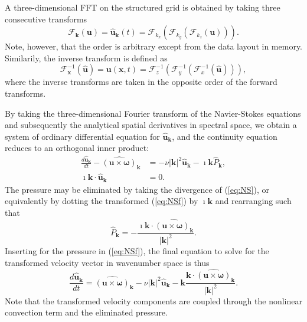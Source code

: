 \documentclass[11pt, oneside]{article}
\begin{document}
A three-dimensional FFT on the structured grid is obtained by taking three consecutive transforms
\begin{equation}
\mathcal{F}_{\bm{k}}(\bm{u}) = \hat{\bm{u}}_{\bm{k}}(t) = \mathcal{F}_{k_x}\left(\mathcal{F}_{k_y}\left(\mathcal{F}_{k_z}(\bm{u})\right)\right).
\label{eq:FourierT3D}
\end{equation}
Note, however, that the order is arbitrary except from the data layout in memory. Similarily, the inverse transform is defined as
\begin{equation}
\mathcal{F}^{-1}_{\bm{x}}(\hat{\bm{u}}) = \bm{u}(\bm{x}, t) = \mathcal{F}^{-1}_{z}\left(\mathcal{F}^{-1}_{y}\left(\mathcal{F}^{-1}_{x}(\hat{\bm{u}})\right)\right),
\end{equation}
where the inverse transforms are taken in the opposite order of the forward transforms.

By taking the three-dimensional Fourier transform of the Navier-Stokes equations and subsequently the analytical spatial derivatives in spectral space, we obtain a system of ordinary differential equation for $\hat{\bm{u}}_{\bm{k}}$, and the continuity equation reduces to an orthogonal inner product:
\begin{align}
 \frac{d\hat{\bm{u}}_{\bm{k}}}{d t} - \widehat{( \bm{u} \times \bm{\omega})}_{\bm{k}} &= - \nu |\bm{k}|^2  \hat{\bm{u}}_{\bm{k}} - \imath \bm{k} \hat{P}_{\bm{k}}, \label{eq:NSf} \\
 \imath \bm{k} \cdot \hat{\bm{u}}_{\bm{k}} &= 0.
\end{align}
The pressure may be eliminated by taking the divergence of (\ref{eq:NS}), or equivalently by dotting the transformed (\ref{eq:NSf}) by $\imath \bm{k}$ and rearranging such that
\begin{equation}
\hat{P}_{\bm{k}} = - \frac{\imath\bm{k} \cdot \widehat{( \bm{u} \times \bm{\omega})}_{\bm{k}} }{|\bm{k}|^2}.
\label{eq:mod_pressure}
\end{equation}
Inserting for the pressure in (\ref{eq:NSf}), the final equation to solve for the transformed velocity vector in wavenumber space is thus
\begin{equation}
 \frac{d\hat{\bm{u}}_{\bm{k}}}{d t}  = \widehat{( \bm{u} \times \bm{\omega})}_{\bm{k}} - \nu |\bm{k}|^2  \hat{\bm{u}}_{\bm{k}} - \bm{k} \frac{\bm{k} \cdot \widehat{( \bm{u} \times \bm{\omega})}_{\bm{k}} }{|\bm{k}|^2}. \label{eq:NSfinal}
\end{equation}
Note that the transformed velocity components are coupled through the nonlinear convection term and the eliminated pressure.
\end{document}
